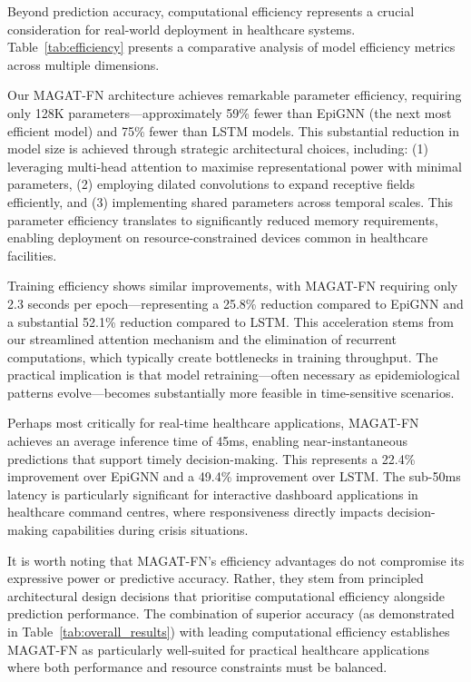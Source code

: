 \documentclass[lettersize, journal]{IEEEtran}
\begin{document}
Beyond prediction accuracy, computational efficiency represents a crucial consideration for real-world deployment in healthcare systems. Table~\ref{tab:efficiency} presents a comparative analysis of model efficiency metrics across multiple dimensions.

Our MAGAT-FN architecture achieves remarkable parameter efficiency, requiring only 128K parameters—approximately 59\% fewer than EpiGNN (the next most efficient model) and 75\% fewer than LSTM models. This substantial reduction in model size is achieved through strategic architectural choices, including: (1) leveraging multi-head attention to maximise representational power with minimal parameters, (2) employing dilated convolutions to expand receptive fields efficiently, and (3) implementing shared parameters across temporal scales. This parameter efficiency translates to significantly reduced memory requirements, enabling deployment on resource-constrained devices common in healthcare facilities.

Training efficiency shows similar improvements, with MAGAT-FN requiring only 2.3 seconds per epoch—representing a 25.8\% reduction compared to EpiGNN and a substantial 52.1\% reduction compared to LSTM. This acceleration stems from our streamlined attention mechanism and the elimination of recurrent computations, which typically create bottlenecks in training throughput. The practical implication is that model retraining—often necessary as epidemiological patterns evolve—becomes substantially more feasible in time-sensitive scenarios.

Perhaps most critically for real-time healthcare applications, MAGAT-FN achieves an average inference time of 45ms, enabling near-instantaneous predictions that support timely decision-making. This represents a 22.4\% improvement over EpiGNN and a 49.4\% improvement over LSTM. The sub-50ms latency is particularly significant for interactive dashboard applications in healthcare command centres, where responsiveness directly impacts decision-making capabilities during crisis situations.

It is worth noting that MAGAT-FN's efficiency advantages do not compromise its expressive power or predictive accuracy. Rather, they stem from principled architectural design decisions that prioritise computational efficiency alongside prediction performance. The combination of superior accuracy (as demonstrated in Table~\ref{tab:overall_results}) with leading computational efficiency establishes MAGAT-FN as particularly well-suited for practical healthcare applications where both performance and resource constraints must be balanced.
\end{document}
